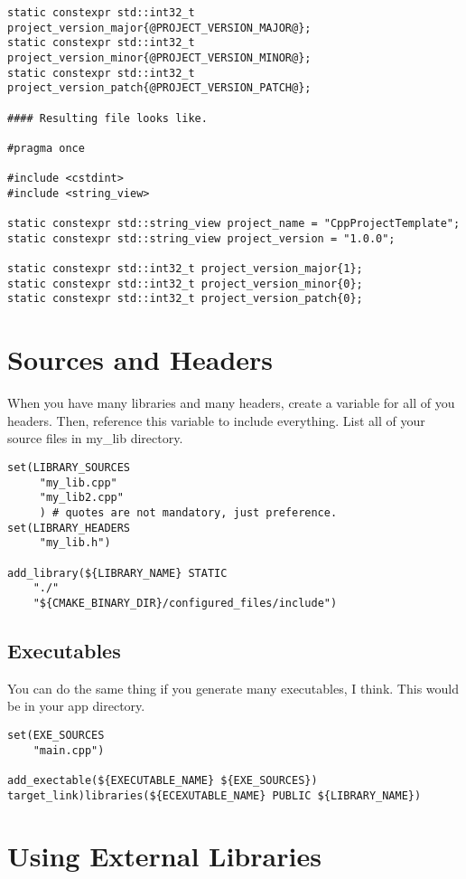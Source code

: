 \begin{verbatim}
static constexpr std::int32_t project_version_major{@PROJECT_VERSION_MAJOR@};
static constexpr std::int32_t project_version_minor{@PROJECT_VERSION_MINOR@};
static constexpr std::int32_t project_version_patch{@PROJECT_VERSION_PATCH@};

#### Resulting file looks like.

#pragma once

#include <cstdint>
#include <string_view>

static constexpr std::string_view project_name = "CppProjectTemplate";
static constexpr std::string_view project_version = "1.0.0";

static constexpr std::int32_t project_version_major{1};
static constexpr std::int32_t project_version_minor{0};
static constexpr std::int32_t project_version_patch{0};
\end{verbatim}


\section{Sources and Headers}

When you have many libraries and many headers, create a variable for all of you headers. Then, reference this variable to include
everything. List all of your source files in my\_lib directory.

\begin{verbatim}
set(LIBRARY_SOURCES
     "my_lib.cpp"
     "my_lib2.cpp"
     ) # quotes are not mandatory, just preference.
set(LIBRARY_HEADERS
     "my_lib.h")

add_library(${LIBRARY_NAME} STATIC
    "./"
    "${CMAKE_BINARY_DIR}/configured_files/include")
\end{verbatim}

\subsection{Executables}

You can do the same thing if you generate many executables, I think. This would be in your app directory.

\begin{verbatim}
set(EXE_SOURCES
    "main.cpp")

add_exectable(${EXECUTABLE_NAME} ${EXE_SOURCES})
target_link)libraries(${ECEXUTABLE_NAME} PUBLIC ${LIBRARY_NAME})
\end{verbatim}


\section{Using External Libraries}



